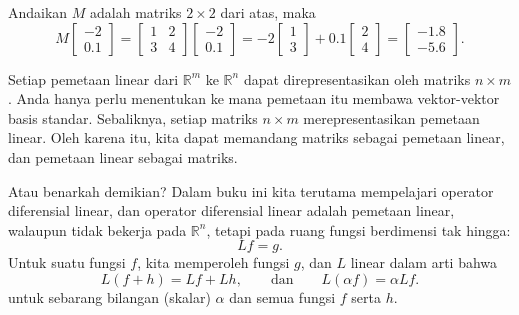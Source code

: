 Andaikan $M$ adalah matriks $2 \times 2$ dari atas,
maka
\begin{equation*}
M
\begin{bmatrix}
-2 \\ 0.1
\end{bmatrix}
=
\begin{bmatrix}
1 & 2 \\
3 & 4
\end{bmatrix}
\begin{bmatrix}
-2 \\ 0.1
\end{bmatrix}
=
-2
\begin{bmatrix}
1 \\ 3
\end{bmatrix}
+
0.1
\begin{bmatrix}
2 \\ 4
\end{bmatrix}
=
\begin{bmatrix}
-1.8 \\ -5.6
\end{bmatrix} .
\end{equation*}

Setiap pemetaan linear dari ${\mathbb R}^m$ ke ${\mathbb R}^n$ dapat
direpresentasikan oleh matriks $n \times m$. Anda hanya perlu menentukan ke mana pemetaan itu
membawa vektor-vektor basis standar. Sebaliknya, setiap matriks $n \times m$
merepresentasikan pemetaan linear. Oleh karena itu, kita dapat memandang matriks sebagai
pemetaan linear, dan pemetaan linear sebagai matriks.

Atau benarkah demikian? Dalam buku ini kita terutama mempelajari operator diferensial
linear, dan operator diferensial linear adalah pemetaan linear, walaupun tidak bekerja pada
${\mathbb R}^n$, tetapi pada
ruang fungsi berdimensi tak hingga:
\begin{equation*}
L f = g .
\end{equation*}
Untuk suatu fungsi $f$, kita memperoleh fungsi $g$, dan $L$ linear dalam arti bahwa
\begin{equation*}
L ( f + h) = Lf + Lh, \qquad \text{dan} \qquad
L (\alpha f) = \alpha Lf .
\end{equation*}
untuk sebarang bilangan (skalar) $\alpha$ dan semua fungsi $f$ serta $h$.

